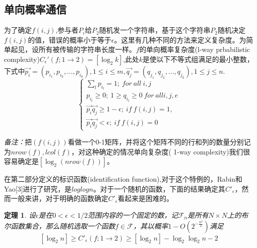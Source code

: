 \documentclass[]{article}
\newtheorem{theorem}{定理}
\begin{document}
	\subsection{单向概率通信}
	为了确定$f(i,j)$,参与者$P_i$给$P_2$随机发一个字符串，基于这个字符串$P_2$随机决定$f(i,j)$的值，错误的概率小于等于$\epsilon$。这里有几种不同的方法来定义复杂度。为简单起见，设所有被传输的字符串长度一样。$f$的单向概率复杂度(l-way prbabilistic complexity)$C_{\epsilon}'(f;1\rightarrow 2)=\left[ \log_2 k\right] $,此处$k$是使以下不等式组满足的最小整数，下式中$\vec{p_i}=(p_{i_1},p_{i_2},\ldots,p_{i_k}),1\leq i \leq m,\vec{q_j}=(q_{j_1},q_{j_2},\ldots,q_{j_k}),1\leq j \leq n$.\\
	\begin{equation}\label{equa6}
		\left\lbrace 
		\begin{array}{l}
			\sum_{l}^{} {p_{i_l}} =1;\ for\ all \ i,j\\
			p_{i_l}\geq 0;\ 1\geq q_{i_l}\geq 0\ for \ all i,j,e\\
			\vec{p_i}\vec{q_j}\geq 1-\epsilon ; \ if\ f(i,j)=1,\\
			\vec{p_i}\vec{q_j}<\epsilon; \ if\ f(i,j)=0
		\end{array}
		\right. 
	\end{equation}
	\par
	\textit{备注：}把$(f(i,j))$看做一个0-1矩阵，并将这个矩阵不同的行和列的数量分别记为$nrow(f),lcol(f)$，对这种确定的情况单向复杂度( 1-way complexity)我们很容易确定是$[\log_2(nrow(f))]$。
	\par
	在第二部分定义的标识函数(identification function),对于这个特例的，Rabin和Yao[3]进行了研究，是$loglog n$。对于一个随机的函数，下面的结果确定其$C'_\epsilon$，然而一般来讲，对于明确的函数确定$C'_\epsilon$看起来是困难的。
	
	\begin{theorem}\label{theo4}
		设$\epsilon$是在$0<\epsilon < 1/2$范围内容的一个固定的数，记$\mathscr{F}_n$是所有$N\times N$上的布尔函数集合，那么随机选取一个函数$f\in \mathscr{F}$，其以概率$1-O(2^{-\frac{n^2}{2}})$满足
		\[[\log_2 n] \geq C'_\epsilon (f;1 \rightarrow 2) \geq [\log_2 n]-\log_2 \log_2 n -2 \]
	\end{theorem}
	
\end{document}
